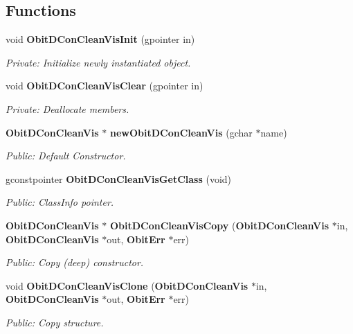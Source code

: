 \subsection*{Functions}
\begin{CompactItemize}
\item 
void {\bf Obit\-DCon\-Clean\-Vis\-Init} (gpointer in)
\begin{CompactList}\small\item\em Private: Initialize newly instantiated object. \item\end{CompactList}\item 
void {\bf Obit\-DCon\-Clean\-Vis\-Clear} (gpointer in)
\begin{CompactList}\small\item\em Private: Deallocate members. \item\end{CompactList}\item 
{\bf Obit\-DCon\-Clean\-Vis} $\ast$ {\bf new\-Obit\-DCon\-Clean\-Vis} (gchar $\ast$name)
\begin{CompactList}\small\item\em Public: Default Constructor. \item\end{CompactList}\item 
gconstpointer {\bf Obit\-DCon\-Clean\-Vis\-Get\-Class} (void)
\begin{CompactList}\small\item\em Public: Class\-Info pointer. \item\end{CompactList}\item 
{\bf Obit\-DCon\-Clean\-Vis} $\ast$ {\bf Obit\-DCon\-Clean\-Vis\-Copy} ({\bf Obit\-DCon\-Clean\-Vis} $\ast$in, {\bf Obit\-DCon\-Clean\-Vis} $\ast$out, {\bf Obit\-Err} $\ast$err)
\begin{CompactList}\small\item\em Public: Copy (deep) constructor. \item\end{CompactList}\item 
void {\bf Obit\-DCon\-Clean\-Vis\-Clone} ({\bf Obit\-DCon\-Clean\-Vis} $\ast$in, {\bf Obit\-DCon\-Clean\-Vis} $\ast$out, {\bf Obit\-Err} $\ast$err)
\begin{CompactList}\small\item\em Public: Copy structure. \item\end{CompactList}\item 

\end{CompactItemize}
